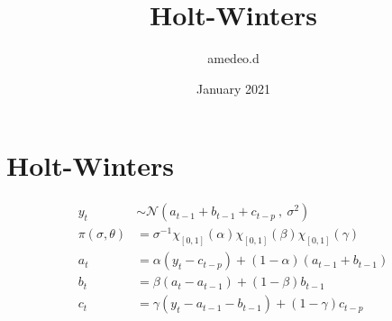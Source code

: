 \documentclass{article}
\title{Holt-Winters}
\author{amedeo.d }
\date{January 2021}
\begin{document}
\maketitle

\section{Holt-Winters}

\[ 
\begin{split}
y_t & \sim \mathcal{N} (a_{t-1} + b_{t-1} + c_{t-p} \ , \ \sigma^2) \\
\pi(\sigma, \theta) & = \sigma^{-1} \chi_{[0,1]}(\alpha)\chi_{[0,1]}(\beta)\chi_{[0,1]}(\gamma)    \\
a_t & = \alpha (y_t - c_{t-p}) + (1-\alpha)(a_{t-1} + b_{t-1}) \\
b_t & = \beta(a_t - a_{t-1}) + (1-\beta) b_{t-1} \\
c_t & = \gamma(y_t - a_{t-1} - b_{t-1}) + (1-\gamma)c_{t-p} \\
\end{split}
\]
\end{document}
